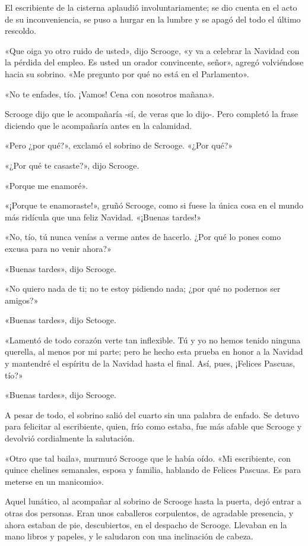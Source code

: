 \documentclass{novela}
\begin{document}
 El escribiente de la cisterna aplaudió involuntariamente; se dio cuenta en el acto de su inconveniencia, se puso a hurgar en la lumbre y se apagó del todo el último rescoldo.

 «Que oiga yo otro ruido de usted», dijo Scrooge, «y va a celebrar la Navidad con la pérdida del empleo. Es usted un orador convincente, señor», agregó volviéndose hacia su sobrino. «Me pregunto por qué no está en el Parlamento».

 «No te enfades, tío. ¡Vamos! Cena con nosotros mañana».

 Scrooge dijo que le acompañaría -sí, de veras que lo dijo-. Pero completó la frase diciendo que le acompañaría antes en la calamidad.

 «Pero ¿por qué?», exclamó el sobrino de Scrooge. «¿Por qué?»

 «¿Por qué te casaste?», dijo Scrooge.

 «Porque me enamoré».

 «¡Porque te enamoraste!», gruñó Scrooge, como si fuese la única cosa en el mundo más ridícula que una feliz Navidad. «¡Buenas tardes!»

 «No, tío, tú nunca venías a verme antes de hacerlo. ¿Por qué lo pones como excusa para no venir ahora?»

 «Buenas tardes», dijo Scrooge.

 «No quiero nada de ti; no te estoy pidiendo nada; ¿por qué no podernos ser amigos?»

 «Buenas tardes», dijo Sctooge.

 «Lamentó de todo corazón verte tan inflexible. Tú y yo no hemos tenido ninguna querella, al menos por mi parte; pero he hecho esta prueba en honor a la Navidad y mantendré el espíritu de la Navidad hasta el final. Así, pues, ¡Felices Pascuas, tío?»

 «Buenas tardes», dijo Scrooge.

 A pesar de todo, el sobrino salió del cuarto sin una palabra de enfado. Se detuvo para felicitar al escribiente, quien, frío como estaba, fue más afable que Scrooge y devolvió cordialmente la salutación.

 «Otro que tal baila», murmuró Scrooge que le había oído. «Mi escribiente, con quince chelines semanales, esposa y familia, hablando de Felices Pascuas. Es para meterse en un manicomio».

 Aquel lunático, al acompañar al sobrino de Scrooge hasta la puerta, dejó entrar a otras dos personas. Eran unos caballeros corpulentos, de agradable presencia, y ahora estaban de pie, descubiertos, en el despacho de Scrooge. Llevaban en la mano libros y papeles, y le saludaron con una inclinación de cabeza.
\end{document}
